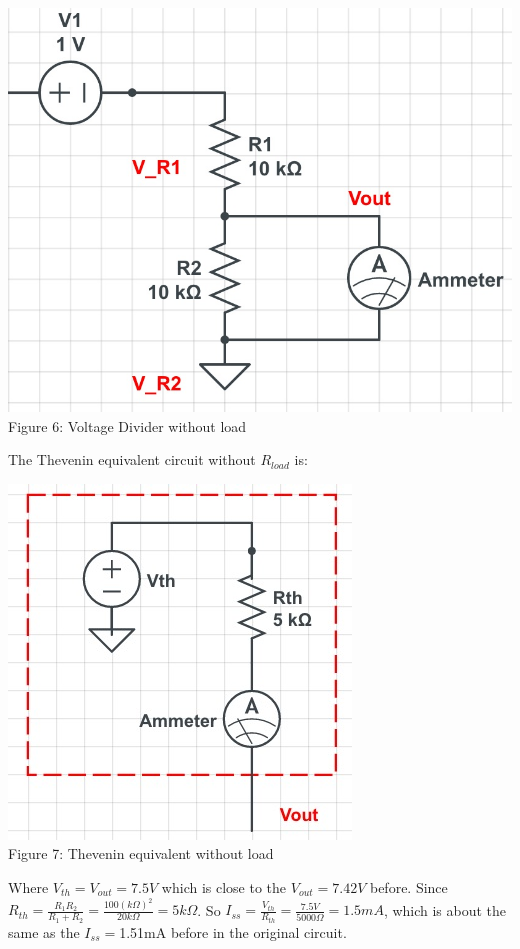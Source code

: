 \documentclass[]{article}
\begin{document}
	\begin{center} 
		\includegraphics[scale=0.2]{lab1_thev2}\\			
		Figure 6: Voltage Divider without load 
	\end{center}
	The Thevenin equivalent circuit without $R_{load}$ is:
	\begin{center} 
		\includegraphics[scale=0.4]{lab1_thev4}\\			
		Figure 7: Thevenin equivalent without load
		\end{center}
	Where $V_{th}=V_{out}=7.5V$ which is close to the $V_{out}=7.42V$ before. Since $R_{th}=\frac{R_{1}R_{2}}{R_{1}+R_{2}}=\frac{100(k\Omega)^2}{20k\Omega}=5k\Omega$. So $I_{ss}=\frac{V_{th}}{R_{th}}=\frac{7.5V}{5000\Omega}=1.5mA$, which is about the same as the $I_{ss}=$1.51mA before in the original circuit.\\
\end{document}
